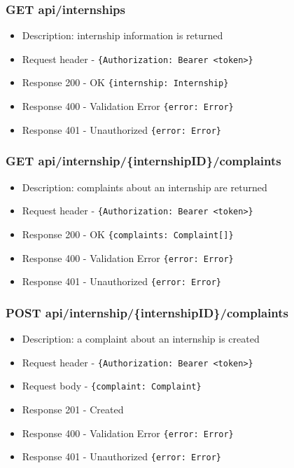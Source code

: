 \subsubsection{GET api/internships}
\begin{itemize}
    \item Description: internship information is returned
    \item Request header - \verb|{Authorization: Bearer <token>}|
    \item Response 200 - OK \verb|{internship: Internship}|
    \item Response 400 - Validation Error \verb|{error: Error}|
    \item Response 401 - Unauthorized \verb|{error: Error}|
\end{itemize}

\subsubsection{GET api/internship/\{internshipID\}/complaints}
\begin{itemize}
    \item Description: complaints about an internship are returned
    \item Request header - \verb|{Authorization: Bearer <token>}|
    \item Response 200 - OK \verb|{complaints: Complaint[]}|
    \item Response 400 - Validation Error \verb|{error: Error}|
    \item Response 401 - Unauthorized \verb|{error: Error}|
\end{itemize}

\subsubsection{POST api/internship/\{internshipID\}/complaints}
\begin{itemize}
    \item Description: a complaint about an internship is created
    \item Request header - \verb|{Authorization: Bearer <token>}|
    \item Request body - \verb|{complaint: Complaint}|
    \item Response 201 - Created
    \item Response 400 - Validation Error \verb|{error: Error}|
    \item Response 401 - Unauthorized \verb|{error: Error}|
\end{itemize}

